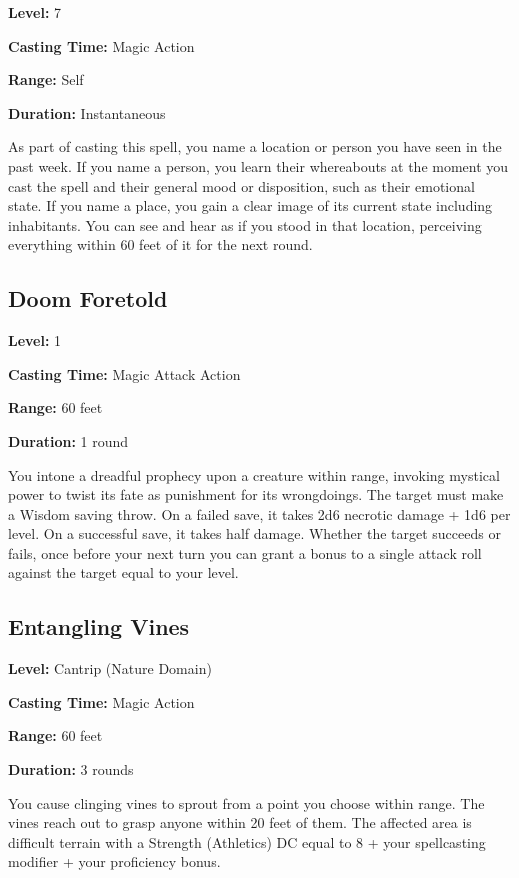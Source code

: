 \documentclass[12pt,letterpaper,twocolumn,openany,nodeprecatedcode,bg=none]{dndbook}
\begin{document}
\textbf{Level:} 7

\textbf{Casting Time:} Magic Action

\textbf{Range:} Self

\textbf{Duration:} Instantaneous

As part of casting this spell, you name a location or person you have
seen in the past week. If you name a person, you learn their whereabouts
at the moment you cast the spell and their general mood or disposition,
such as their emotional state. If you name a place, you gain a clear
image of its current state including inhabitants. You can see and hear
as if you stood in that location, perceiving everything within 60 feet
of it for the next round.

\subsection{Doom Foretold}\label{doom-foretold}

\textbf{Level:} 1

\textbf{Casting Time:} Magic Attack Action

\textbf{Range:} 60 feet

\textbf{Duration:} 1 round

You intone a dreadful prophecy upon a creature within range, invoking
mystical power to twist its fate as punishment for its wrongdoings. The
target must make a Wisdom saving throw. On a failed save, it takes 2d6
necrotic damage + 1d6 per level. On a successful save, it takes half
damage. Whether the target succeeds or fails, once before your next turn
you can grant a bonus to a single attack roll against the target equal
to your level.

\clearpage

\subsection{Entangling Vines}\label{entangling-vines}

\textbf{Level:} Cantrip (Nature Domain)

\textbf{Casting Time:} Magic Action

\textbf{Range:} 60 feet

\textbf{Duration:} 3 rounds

You cause clinging vines to sprout from a point you choose within range.
The vines reach out to grasp anyone within 20 feet of them. The affected
area is difficult terrain with a Strength (Athletics) DC equal to 8 +
your spellcasting modifier + your proficiency bonus.
\end{document}
